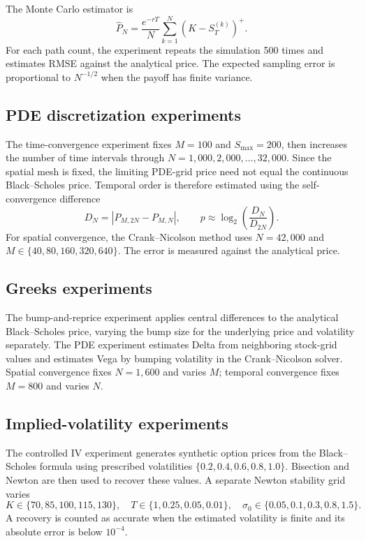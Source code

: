 \documentclass[11pt,a4paper]{article}
\begin{document}
The Monte Carlo estimator is
\begin{equation}
  \widehat P_N=\frac{e^{-rT}}{N}
  \sum_{k=1}^{N}(K-S_T^{(k)})^+.
\end{equation}
For each path count, the experiment repeats the simulation 500 times and estimates RMSE against the analytical price. The expected sampling error is proportional to $N^{-1/2}$ when the payoff has finite variance.

\subsection{PDE discretization experiments}

The time-convergence experiment fixes $M=100$ and $S_{\max}=200$, then increases the number of time intervals through
$N=1{,}000,2{,}000,\ldots,32{,}000$. Since the spatial mesh is fixed, the limiting PDE-grid price need not equal the continuous Black--Scholes price. Temporal order is therefore estimated using the self-convergence difference
\begin{equation}
  D_N=\left|P_{M,2N}-P_{M,N}\right|,
  \qquad p\approx\log_2\left(\frac{D_N}{D_{2N}}\right).
\end{equation}
For spatial convergence, the Crank--Nicolson method uses $N=42{,}000$ and
$M\in\{40,80,160,320,640\}$. The error is measured against the analytical price.

\subsection{Greeks experiments}

The bump-and-reprice experiment applies central differences to the analytical Black--Scholes price, varying the bump size for the underlying price and volatility separately. The PDE experiment estimates Delta from neighboring stock-grid values and estimates Vega by bumping volatility in the Crank--Nicolson solver. Spatial convergence fixes $N=1{,}600$ and varies $M$; temporal convergence fixes $M=800$ and varies $N$.

\subsection{Implied-volatility experiments}

The controlled IV experiment generates synthetic option prices from the Black--Scholes formula using prescribed volatilities
$\{0.2,0.4,0.6,0.8,1.0\}$. Bisection and Newton are then used to recover these values. A separate Newton stability grid varies
\[
K\in\{70,85,100,115,130\},\quad
T\in\{1,0.25,0.05,0.01\},\quad
\sigma_0\in\{0.05,0.1,0.3,0.8,1.5\}.
\]
A recovery is counted as accurate when the estimated volatility is finite and its absolute error is below $10^{-4}$.
\end{document}
